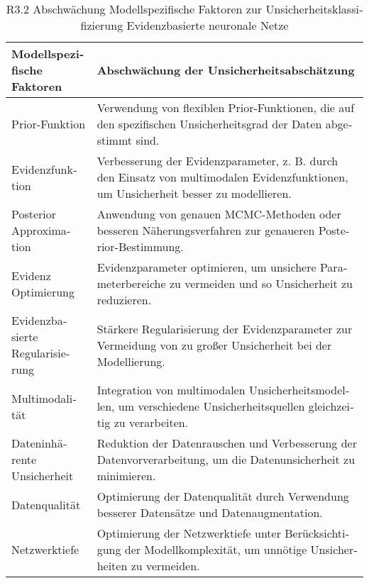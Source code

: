 \begin{otherlanguage}{ngerman}
\begin{table}[!htpb]
  \centering
  \begin{tabularx}{\textwidth}{|l|X|}
    \hline
    \textbf{Modellspezifische Faktoren} & \textbf{Abschwächung der Unsicherheitsabschätzung} \\
    \hline
    Prior-Funktion & Verwendung von flexiblen Prior-Funktionen, die auf den spezifischen Unsicherheitsgrad der Daten abgestimmt sind. \\
    \hline
    Evidenzfunktion & Verbesserung der Evidenzparameter, z. B. durch den Einsatz von multimodalen Evidenzfunktionen, um Unsicherheit besser zu modellieren. \\
    \hline
    Posterior Approximation & Anwendung von genauen MCMC-Methoden oder besseren Näherungsverfahren zur genaueren Posterior-Bestimmung. \\
    \hline
    Evidenz Optimierung & Evidenzparameter optimieren, um unsichere Parameterbereiche zu vermeiden und so Unsicherheit zu reduzieren. \\
    \hline
    Evidenzbasierte Regularisierung & Stärkere Regularisierung der Evidenzparameter zur Vermeidung von zu großer Unsicherheit bei der Modellierung. \\
    \hline
    Multimodalität & Integration von multimodalen Unsicherheitsmodellen, um verschiedene Unsicherheitsquellen gleichzeitig zu verarbeiten. \\
    \hline
    Dateninhärente Unsicherheit & Reduktion der Datenrauschen und Verbesserung der Datenvorverarbeitung, um die Datenunsicherheit zu minimieren. \\
    \hline
    Datenqualität & Optimierung der Datenqualität durch Verwendung besserer Datensätze und Datenaugmentation. \\
    \hline
    Netzwerktiefe & Optimierung der Netzwerktiefe unter Berücksichtigung der Modellkomplexität, um unnötige Unsicherheiten zu vermeiden. \\
    \hline
  \end{tabularx}
  \caption{R3.2 Abschwächung Modellspezifische Faktoren zur Unsicherheitsklassifizierung \gls{Evidenzbasierte neuronale Netze}}\label{tab:chapter6r33}
\end{table}




\end{otherlanguage}
